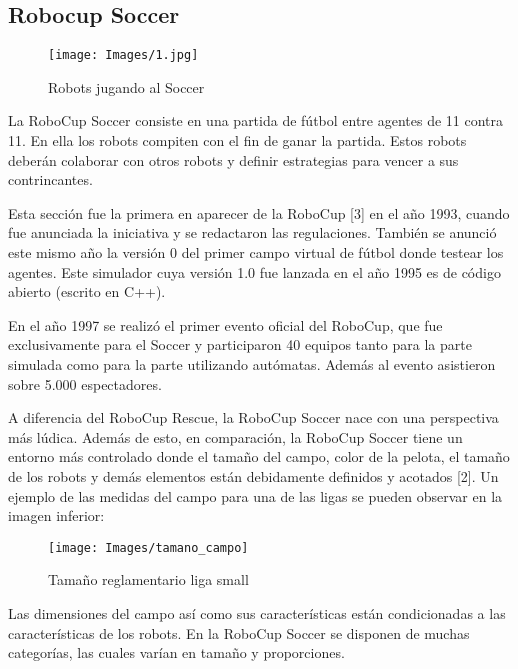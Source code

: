 \documentclass[11pt,oneside,a4paper]{book}
\begin{document}
\subsection{Robocup Soccer}
\begin{figure}[H]
\begin{center}
\texttt{[image: Images/1.jpg]}
\caption{Robots jugando al Soccer}
\end{center}
\end{figure}
La RoboCup Soccer consiste en una partida de fútbol entre agentes de 11 contra 11. En ella los robots compiten con el fin de ganar la partida. Estos robots deberán colaborar con otros robots y definir estrategias para vencer a sus contrincantes.

Esta sección fue la primera en aparecer de la RoboCup [3] en el año 1993, cuando fue anunciada la iniciativa y se redactaron las regulaciones. También se anunció este mismo año la versión 0 del primer campo virtual de fútbol donde testear los agentes. Este simulador cuya versión 1.0 fue lanzada en el año 1995 es de código abierto (escrito en C++).


En el año 1997 se realizó el primer evento oficial del RoboCup, que fue exclusivamente para el Soccer y participaron 40 equipos tanto para la parte simulada como para la parte utilizando autómatas. Además al evento asistieron sobre 5.000 espectadores.

A diferencia del RoboCup Rescue, la RoboCup Soccer nace con una perspectiva más lúdica. Además de esto, en comparación, la RoboCup Soccer tiene un entorno más controlado donde el tamaño del campo, color de la pelota, el tamaño de los robots y demás elementos están debidamente definidos y acotados [2]. Un ejemplo de las medidas del campo para una de las ligas se pueden observar en la imagen inferior:

\begin{figure}[H]
\begin{center}
\texttt{[image: Images/tamano\_campo]}
\caption{Tamaño reglamentario liga small}
\end{center}
\end{figure}

Las dimensiones del campo así como sus características están condicionadas a las características de los robots. En la RoboCup Soccer se disponen de muchas categorías, las cuales varían en tamaño y proporciones.
\end{document}
